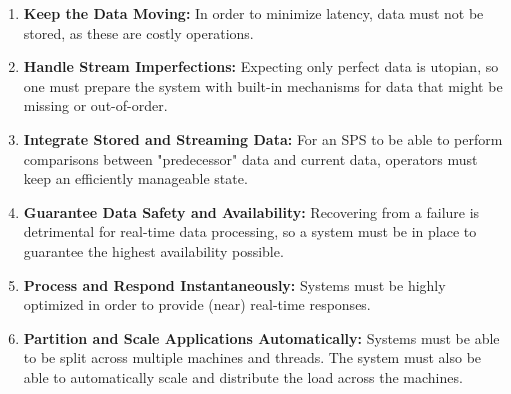         \begin{enumerate}
            \item \textbf{Keep the Data Moving:} 
                In order to minimize latency, data must not be stored, as these are costly operations.
            \item \textbf{Handle Stream Imperfections:} 
                Expecting only perfect data is utopian, so one must prepare the system with built-in mechanisms for data that might be missing or out-of-order.
            \item \textbf{Integrate Stored and Streaming Data:} 
                For an SPS to be able to perform comparisons between "predecessor" data and current data, operators must keep an efficiently manageable state.
            \item \textbf{Guarantee Data Safety and Availability:} 
                Recovering from a failure is detrimental for real-time data processing, so a system must be in place to guarantee the highest availability possible.
            \item \textbf{Process and Respond Instantaneously:} 
                Systems must be highly optimized in order to provide (near) real-time responses.
            \item \textbf{Partition and Scale Applications Automatically:} 
                Systems must be able to be split across multiple machines and threads.
                The system must also be able to automatically scale and distribute the load across the machines.

        \end{enumerate}

